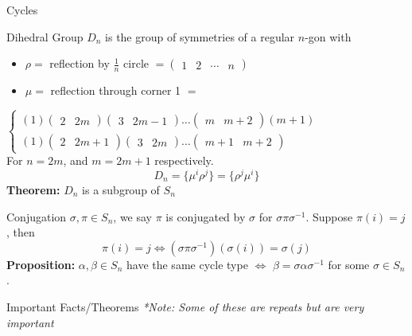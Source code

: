 \documentclass{article}
\begin{document}
\begin{multicols*}{3}
\begin{blackbox}{Cycles}
\end{blackbox}
\begin{blackbox}{Dihedral Group}
$D_n$ is the group of symmetries of a regular $n$-gon with 
\begin{itemize}
    \item $\rho =$ reflection by $\frac{1}{n}$ circle $ = \begin{pmatrix}
        1 & 2 & \cdots & n
    \end{pmatrix}$
    \item $\mu=$ reflection through corner 1 $=$\\[-2ex]
\end{itemize}
$\begin{cases}
        (1)\begin{pmatrix}2 & 2m\end{pmatrix}\begin{pmatrix}3 & 2m-1\end{pmatrix}\ldots
        \begin{pmatrix}m & m+2\end{pmatrix}(m+1)\\
        (1)\begin{pmatrix}2 & 2m+1\end{pmatrix}\begin{pmatrix}3 & 2m\end{pmatrix}\ldots
        \begin{pmatrix}m+1 & m+2\end{pmatrix}
    \end{cases}$\\[1ex]
    For $n = 2m$, and $m = 2m+1$ respectively. \\[1ex]
    \[D_n = \{\mu^i\rho^j\} = \{\rho^j\mu^i\}\]
    \textbf{Theorem:} $D_n$ is a subgroup of $S_n$
\end{blackbox}
\begin{blackbox}{Conjugation}
    $\sigma, \pi \in S_n$, we say $\pi$ is conjugated by $\sigma$ for $\sigma\pi\sigma^{-1}$. Suppose $\pi(i) = j$, then\\[-2ex]
    \[\pi(i) = j \iff (\sigma\pi\sigma^{-1})(\sigma(i)) = \sigma(j)\]
    \textbf{Proposition:} $\alpha, \beta \in S_n$ have the same cycle type $\iff$ $\beta = \sigma \alpha \sigma^{-1}$ for some $\sigma \in S_n$.
\end{blackbox}
\begin{blackbox}{Important Facts/Theorems}
    \textit{*Note: Some of these are repeats but are very important}
    \raggedright
    \begin{itemize}

\end{itemize}
\end{blackbox}
\end{multicols*}
\end{document}
